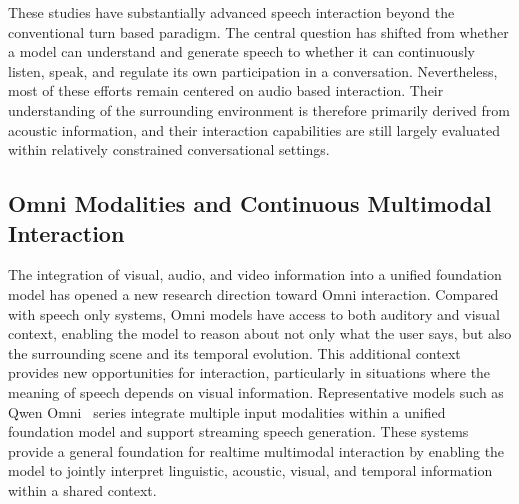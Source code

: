 These studies have substantially advanced speech interaction beyond the conventional turn based paradigm. The central question has shifted from whether a model can understand and generate speech to whether it can continuously listen, speak, and regulate its own participation in a conversation. Nevertheless, most of these efforts remain centered on audio based interaction. Their understanding of the surrounding environment is therefore primarily derived from acoustic information, and their interaction capabilities are still largely evaluated within relatively constrained conversational settings.

\subsection{Omni Modalities and Continuous Multimodal Interaction} The integration of visual, audio, and video information into a unified foundation model has opened a new research direction toward Omni interaction. Compared with speech only systems, Omni models have access to both auditory and visual context, enabling the model to reason about not only what the user says, but also the surrounding scene and its temporal evolution. This additional context provides new opportunities for interaction, particularly in situations where the meaning of speech depends on visual information. Representative models such as Qwen Omni~\cite{qwen3.5omni,qwen3omni} series integrate multiple input modalities within a unified foundation model and support streaming speech generation. These systems provide a general foundation for realtime multimodal interaction by enabling the model to jointly interpret linguistic, acoustic, visual, and temporal information within a shared context.



